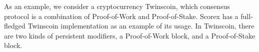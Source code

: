 As an example, we consider a cryptocurrency Twinscoin, which consensus protocol is a combination of Proof-of-Work and Proof-of-Stake. Scorex has a full-fledged Twinscoin implementation as an example of its usage. In Twinscoin, there are two kinds of persistent modifiers, a Proof-of-Work block, and a Proof-of-Stake block. 
